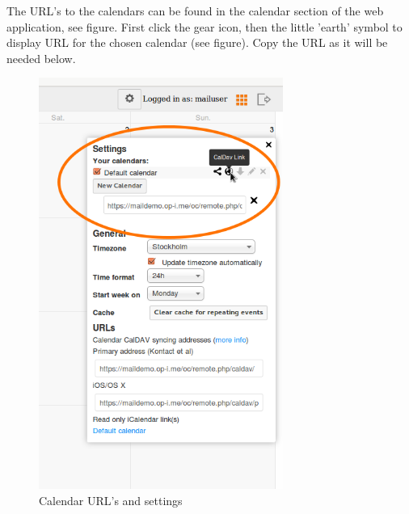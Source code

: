 \documentclass[12pt,a4paper,titlepage]{article}
\begin{document}
The URL's to the calendars can be found in the calendar section of the web application, see figure. First click the gear icon, then the little 'earth' symbol to display URL for the chosen calendar (see figure). Copy the URL as it will be needed below.
\begin{figure}[h!]
\centering
\includegraphics[width=8cm]{./img/External-clients-calendar1.png}
\caption{Calendar URL's and settings}
\end{figure}
\end{document}
